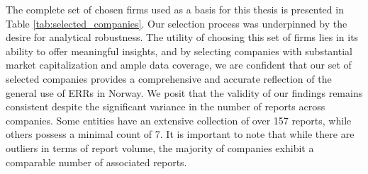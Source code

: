 The complete set of chosen firms used as a basis for this thesis is presented in Table \ref{tab:selected_companies}. Our selection process was underpinned by the desire for analytical robustness. The utility of choosing this set of firms lies in its ability to offer meaningful insights, and by selecting companies with substantial market capitalization and ample data coverage, we are confident that our set of selected companies provides a comprehensive and accurate reflection of the general use of ERRs in Norway. We posit that the validity of our findings remains consistent despite the significant variance in the number of reports across companies. Some entities have an extensive collection of over 157 reports, while others possess a minimal count of 7. It is important to note that while there are outliers in terms of report volume, the majority of companies exhibit a comparable number of associated reports.

